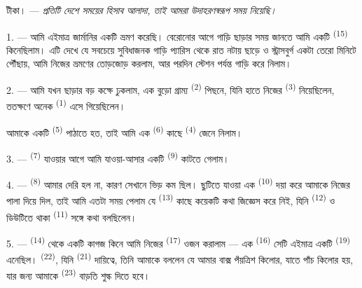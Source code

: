 %

\VUsaut{4.0mm}
\VUsaut{2.4mm}
\VUsaut{3.4mm}
\textsc{টীকা।} --- \textit{প্রতিটি দেশে সময়ের হিসাব আলাদা, তাই আমরা
উদাহরণস্বরূপ}  \textit{সময় নিয়েছি।}

1. --- আমি এইমাত্র জার্মানির একটি ভ্রমণ করেছি। বেরোনোর আগে গাড়ি ছাড়ার সময়
জানতে আমি একটি  \textsuperscript{(15)} কিনেছিলাম। এটি দেখে যে
সবচেয়ে সুবিধাজনক গাড়ি প্যারিস থেকে রাত নটায় ছাড়ে ও স্ট্রাসবুর্গ একটা তেরো
মিনিটে পৌঁছায়, আমি নিজের ভ্রমণের তোড়জোড় করলাম, আর পরদিন স্টেশন পর্যন্ত
গাড়ি করে নিলাম।

2. --- আমি যখন ছাড়ার বড় কক্ষে ঢুকলাম, এক বুড়ো গ্রাম্য 
\textsuperscript{(2)} পিছনে, যিনি হাতে নিজের 
\textsuperscript{(3)} নিয়েছিলেন, ততক্ষণে অনেক 
\textsuperscript{(1)} এসে গিয়েছিলেন।

আমাকে একটি  \textsuperscript{(5)} পাঠাতে হত, তাই আমি এক
 \textsuperscript{(6)} কাছে 
\textsuperscript{(4)} জেনে নিলাম।

3. ---  \textsuperscript{(7)} যাওয়ার আগে আমি যাওয়া-আসার
একটি  \textsuperscript{(9)} কাটতে গেলাম।

4. ---  \textsuperscript{(8)} আমার দেরি হল না, কারণ সেখানে ভিড়
কম ছিল। ছুটিতে যাওয়া এক  \textsuperscript{(10)} দয়া করে আমাকে
নিজের পালা দিয়ে দিল, তাই আমি এতটা সময় পেলাম যে 
\textsuperscript{(13)} কাছে কয়েকটি কথা জিজ্ঞেস করে নিই, যিনি  \textsuperscript{(12)} ও ডিউটিতে থাকা 
\textsuperscript{(11)} সঙ্গে কথা বলছিলেন।

\VUsaut{3.0mm}

5. ---  \textsuperscript{(14)} থেকে একটি কাগজ কিনে আমি
নিজের  \textsuperscript{(17)} ওজন করালাম --- এক 
\textsuperscript{(16)} সেটি এইমাত্র একটি 
\textsuperscript{(19)} এনেছিল।  \textsuperscript{(22)}, যিনি
 \textsuperscript{(21)} দায়িত্বে, তিনি আমাকে বললেন যে আমার
বাক্স পঁয়ত্রিশ কিলোর, যাতে পাঁচ কিলোর  হয়, যার জন্য
আমাকে  \textsuperscript{(23)} বাড়তি শুল্ক দিতে হবে।

